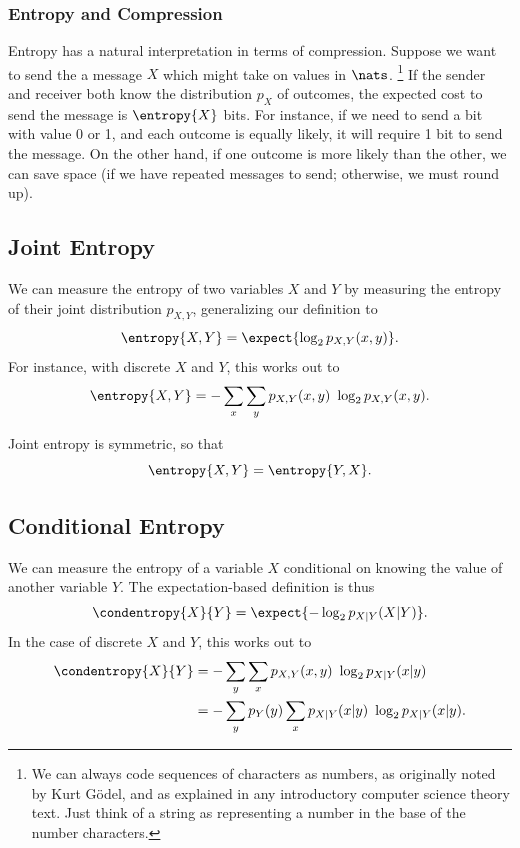 \subsubsection{Entropy and Compression}

Entropy has a natural interpretation in terms of compression.  Suppose
we want to send the a message $X$ which might take on values in
$\nats$.%
%
\footnote{We can always code sequences of characters as numbers, as
originally noted by Kurt G\"odel, and as explained in any introductory
computer science theory text.  Just think of a string as representing
a number in the base of the number characters.}
%
If the sender and receiver both know the distribution $p_X$
of outcomes, the expected cost to send the message is $\entropy{X}$
bits.  For instance, if we need to send a bit with value 0 or 1, and
each outcome is equally likely, it will require 1 bit to send the
message.  On the other hand, if one outcome is more likely than the
other, we can save space (if we have repeated messages to send;
otherwise, we must round up).


\subsection{Joint Entropy}\label{section:stats-joint-entropy}

We can measure the entropy of two variables $X$ and $Y$ by measuring
the entropy of their joint distribution $p_{X,Y}$, generalizing our
definition to
%
\begin{equation}
\entropy{X,Y} = \expect{\log_2 p_{X,Y}(x,y)}.
\end{equation}
%
For instance, with discrete $X$ and $Y$, this works out to
%
\begin{equation}
\entropy{X,Y} = - \sum_{x} \sum_{y} p_{X,Y}(x,y) \ \log_2 p_{X,Y}(x,y).
\end{equation}
%

Joint entropy is symmetric, so that
%
\begin{equation}
\entropy{X,Y} = \entropy{Y,X}.
\end{equation}

\subsection{Conditional Entropy}\label{section:stats-conditional-entropy}

We can measure the entropy of a variable $X$ conditional on knowing
the value of another variable $Y$.  The expectation-based definition
is thus 
%
\begin{equation}
\condentropy{X}{Y} = \expect{-\log_2 p_{X|Y}(X|Y)}.
\end{equation}
%
In the case of discrete $X$ and $Y$, this works out to
%
\begin{align}
\condentropy{X}{Y} 
&= - \sum_y \sum_x p_{X,Y}(x,y) \ \log_2 p_{X|Y}(x|y)
\\
&= - \sum_y p_Y(y) \sum_x p_{X|Y}(x|y) \ \log_2 p_{X|Y}(x|y).
\end{align}
%

